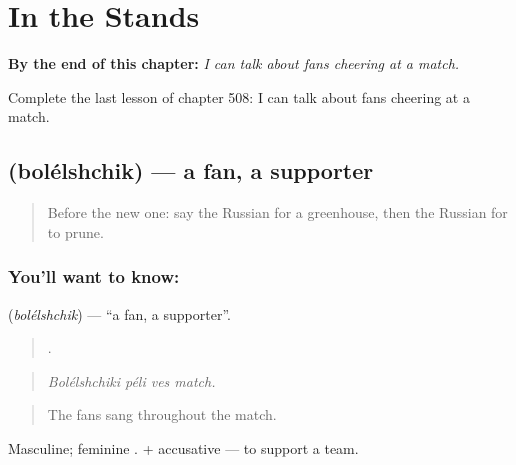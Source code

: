 
\chapter{In the Stands}
\label{ch:ru-in-the-stands}

\begin{chapteropening}
\textbf{By the end of this chapter:} \emph{I can talk about fans cheering at a match.}

Complete the last lesson of chapter 508: I can talk about fans cheering at a match.
\end{chapteropening}

\section[\texorpdfstring{\ru{болельщик} (bolélshchik)}{болельщик (bolélshchik)}]{ (bolélshchik) — a fan, a supporter}

\label{lesson:RU-C508-bolelshchik}



\begin{quote}
Before the new one: say the Russian for a greenhouse, then the Russian for to prune.
\end{quote}

\subsection*{You'll want to know: }
\textbf{} (\emph{bolélshchik}) — \textquotedblleft{}a fan, a supporter\textquotedblright{}.

\begin{quote}
   .
\end{quote}

\begin{quote}
\emph{Bolélshchiki péli ves match.}
\end{quote}

\begin{quote}
The fans sang throughout the match.
\end{quote}

Masculine; feminine . \emph{ } + accusative — to support a team.

